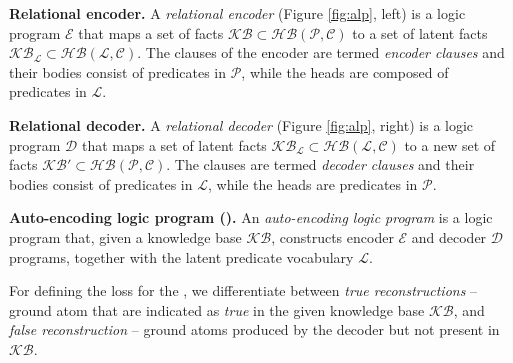 \begin{definition}
\textbf{Relational encoder.} 
A \textit{relational encoder} (Figure \ref{fig:alp}, left) is a logic program $\mathcal{E}$ %
that maps a set of facts $\mathcal{KB} \subset \mathcal{HB(P,C)}$ to a set of latent facts $\mathcal{KB}_{\mathcal{L}} \subset \mathcal{HB(L,C)}$.
The clauses of the encoder are termed \textit{encoder clauses} and their bodies consist of predicates in $\mathcal{P}$, while the heads are composed of predicates in $\mathcal{L}$.
\end{definition}


\begin{definition}
\textbf{Relational decoder.} 
A \textit{relational decoder} (Figure \ref{fig:alp}, right) is a logic program $\mathcal{D}$ %
that maps a set of latent facts $\mathcal{KB}_{\mathcal{L}} \subset \mathcal{HB(L,C)}$  to a new set of facts $\mathcal{KB}' \subset \mathcal{HB(P,C)}$.
The clauses are termed \textit{decoder clauses} and their bodies consist of predicates in $\mathcal{L}$, while the heads are predicates in $\mathcal{P}$.
\end{definition}



\begin{definition}
\textbf{Auto-encoding logic program (\alp{}).} 
An \textit{auto-encoding logic program} is a logic program that, given a knowledge base $\mathcal{KB}$, constructs encoder $\mathcal{E}$ and decoder $\mathcal{D}$ programs, together with the latent predicate vocabulary $\mathcal{L}$. 
\end{definition}


For defining the loss for the , we differentiate between \textit{true reconstructions} -- ground atom that are indicated as \textit{true} in the given knowledge base $\mathcal{KB}$, and \textit{false reconstruction} -- ground atoms produced by the decoder but not present in $\mathcal{KB}$. 

